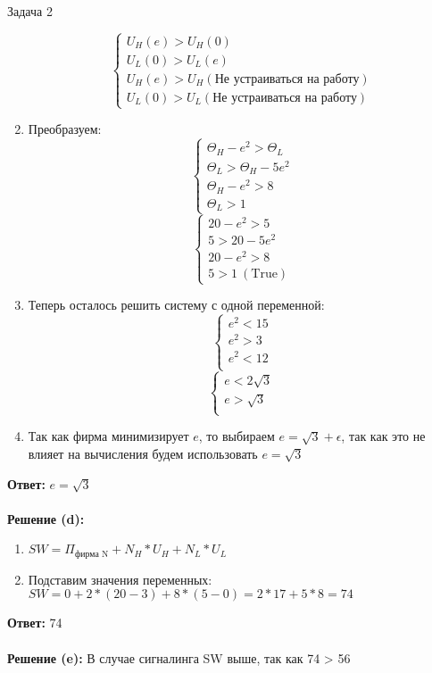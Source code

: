 \begin{mybox}{Задача 2}
\begin{enumerate}
$$\begin{cases}
        U_H(e)>U_H(0) \\
        U_L(0)>U_L(e) \\
        U_H(e)>U_H(\text{Не устраиваться на работу}) \\
        U_L(0)>U_L(\text{Не устраиваться на работу})
    \end{cases}$$
    \item Преобразуем: $$\begin{cases}
        \Theta_H-e^2>\Theta_L \\
        \Theta_L>\Theta_H-5e^2 \\
        \Theta_H-e^2>8 \\
        \Theta_L>1
    \end{cases}$$
    $$\begin{cases}
        20-e^2>5 \\
        5>20-5e^2 \\
        20-e^2>8 \\
        5>1 \ (\text{True})
    \end{cases}$$
    \item Теперь осталось решить систему с одной переменной: $$\begin{cases}
        e^2<15 \\
        e^2>3 \\
        e^2<12 \\
    \end{cases}$$
    $$\begin{cases}
        e<2\sqrt{3} \\
        e>\sqrt{3} \\
    \end{cases}$$
    \item Так как фирма минимизирует $e$, то выбираем $e=\sqrt{3}+\epsilon$, так как это не влияет на вычисления будем использовать $e=\sqrt{3}$
\end{enumerate}
\textbf{Ответ:} $e=\sqrt{3}$\\\\
\textbf{Решение (d):}
\begin{enumerate}
    \item $SW=\Pi_{\text{фирма N}}+N_H*U_H+N_L*U_L$
    \item Подставим значения переменных: $SW=0+2*(20-3)+8*(5-0)=2*17+5*8=74$
\end{enumerate}
\textbf{Ответ:} 74\\\\
\textbf{Решение (e):}
В случае сигналинга SW выше, так как 74 > 56
\end{mybox}

